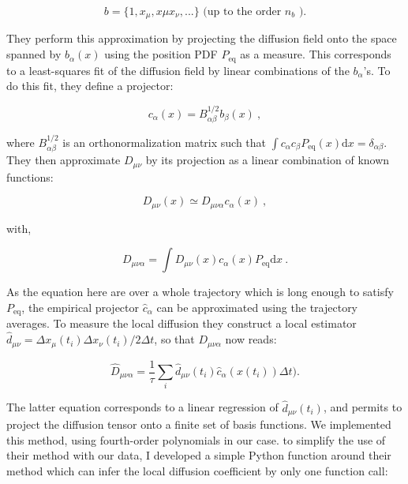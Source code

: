 \begin{equation}
	b = \{1, x_\mu, x\mu x_\nu, ...\} \text{ (up to the order } n_b \text{ )}.
\end{equation} 

They perform this approximation by projecting the diffusion field onto the space spanned by $b_\alpha (x)$ using the position \gls{PDF} $P_\mathrm{eq}$ as a measure. This corresponds to a least-squares fit of the diffusion field by linear combinations of the $b_\alpha$'s. To do this fit, they define a projector:

\begin{equation}
	c_\alpha (x) = B^{1/2}_{\alpha \beta} b_\beta (x) ~,
\end{equation}

where $ B^{1/2}_{\alpha \beta}$ is an orthonormalization matrix such that $\int c_\alpha c_\beta P_\mathrm{eq}(x)\mathrm{d}x = \delta _{\alpha \beta}$. They then approximate $D_{\mu \nu}$ by its projection as a linear combination of known functions:

\begin{equation}
	D_{\mu \nu} (x) \simeq D_{\mu \nu \alpha} c_\alpha (x) ~,
\end{equation}  

with,

\begin{equation}
	D_{\mu \nu \alpha} = \int D_{\mu \nu}(x) c_\alpha (x) P_\mathrm{eq} \mathrm{d}x ~.
\end{equation}

As the equation here are over a whole trajectory which is long enough to satisfy $P_\mathrm{eq}$, the empirical projector $\hat{c}_\alpha$ can be approximated using the trajectory averages. To measure the local diffusion they construct a local estimator $\hat{d}_{\mu \nu} = \Delta x_\mu (t_i) \Delta x_\nu (t_i) / 2\Delta t$, so that $D_{\mu \nu \alpha}$ now reads:

\begin{equation}
	\hat{D}_{\mu \nu \alpha} = \frac{1}{\tau} \sum _i \hat{d}_{\mu \nu} (t_i) \hat{c}_\alpha (x (t_i)) \Delta t).
\end{equation}

The latter equation corresponds to a linear regression of $\hat{d}_{\mu \nu} (t_i)$, and permits to project the diffusion tensor onto a finite set of basis functions. We implemented this method, using fourth-order polynomials in our case. to simplify the use of their method with our data, I developed a simple Python function around their method \href{https://github.com/eXpensia/StochasticForceInference/blob/master/fun_SFI.py}{\faGithub} which can infer the local diffusion coefficient by only one function call: 

